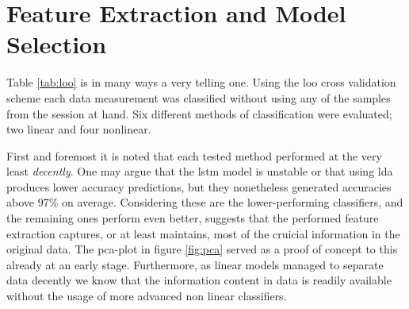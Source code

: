 







\section{Feature Extraction and Model Selection}
\label{disc_feat}
Table \ref{tab:loo} is in many ways a very telling one. Using the \gls{loo} cross validation scheme each data measurement was classified without using any of the samples from the session at hand. Six different methods of classification were evaluated; two linear and four nonlinear. 

First and foremost it is noted that each tested method performed at the very least \emph{decently}. One may argue that the \gls{lstm} model is unstable or that using \gls{lda} produces lower accuracy predictions, but they nonetheless generated accuracies above 97\% on average. Considering these are the lower-performing classifiers, and the remaining ones perform even better, suggests that the performed feature extraction captures, or at least maintains, most of the cruicial information in the original data. The \gls{pca}-plot in figure \ref{fig:pca} served as a proof of concept to this already at an early stage. Furthermore, as linear models managed to separate data decently we know that the information content in data is readily available without the usage of more advanced non linear classifiers.  

